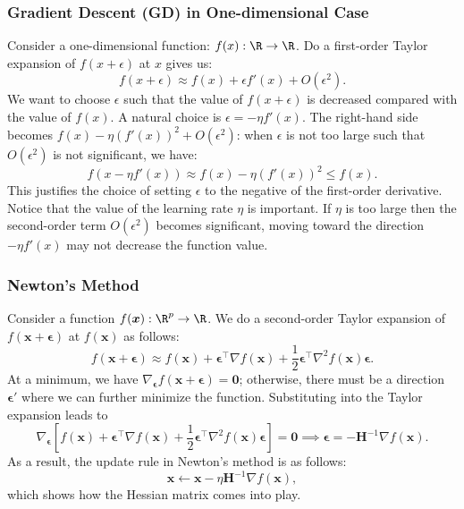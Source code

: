     \subsubsection{Gradient Descent (GD) in One-dimensional Case}
    Consider a one-dimensional function: $f(x): \R \rightarrow \R$.
    Do a first-order Taylor expansion of $f(x + \epsilon)$ at $x$ gives us:
        \begin{equation}
                f(x + \epsilon) \approx f(x) + \epsilon f'(x) + O(\epsilon^2).
        \end{equation}
    We want to choose $\epsilon$ such that the value of $f(x + \epsilon)$ is decreased compared with the value of $f(x)$.
    A natural choice is $\epsilon = -\eta f'(x)$.
    The right-hand side becomes $f(x) - \eta (f'(x))^2 + O(\epsilon^2)$: when $\epsilon$ is not too large such that $O(\epsilon^2)$ is not significant, we have:
        \begin{equation}
            f(x - \eta f'(x)) \approx f(x) - \eta (f'(x))^2 \le f(x).
        \end{equation}
    This justifies the choice of setting $\epsilon$ to the negative of the first-order derivative.
    Notice that the value of the learning rate $\eta$ is important.
    If $\eta$ is too large then the second-order term $O(\epsilon^2)$ becomes significant, moving toward the direction $-\eta f'(x)$ may not decrease the function value.
    
    \subsubsection{Newton's Method}\label{newton-method}
        Consider a function $f(\bm{x}): \R^\nfeat \rightarrow \R$.
        We do a second-order Taylor expansion of $f(\bm{x} + \bm{\epsilon})$ at $f(\bm{x})$ as follows:
            \begin{equation}
                f(\bm{x} + \bm{\epsilon}) \approx f(\bm{x}) + \bm{\epsilon}^{\top} \nabla f(\bm{x}) + \frac{1}{2} \bm{\epsilon}^\top \nabla^2 f(\bm{x}) \bm{\epsilon}.
            \end{equation}
        At a minimum, we have $\nabla_{\bm{\epsilon}} f(\bm{x}+\bm{\epsilon}) = \bm{0}$; otherwise, there must be a direction $\bm{\epsilon}'$ where we can further minimize the function.
        Substituting into the Taylor expansion leads to 
            \begin{equation}
                \nabla_{\bm{\epsilon}}\left[ f(\bm{x}) + \bm{\epsilon}^{\top} \nabla f(\bm{x}) + \frac{1}{2} \bm{\epsilon}^\top \nabla^2 f(\bm{x}) \bm{\epsilon}\right] = \bm{0} \implies \bm{\epsilon} = -\bm{H}^{-1} \nabla f(\bm{x}).
            \end{equation}
        As a result, the update rule in Newton's method is as follows:
            \begin{equation}
                \bm{x} \leftarrow \bm{x} - \eta \bm{H}^{-1} \nabla f(\bm{x}),
            \end{equation}
        which shows how the Hessian matrix comes into play.
    
